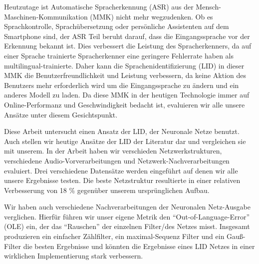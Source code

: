 
\Abstract

Heutzutage ist Automatische Spracherkennung (ASR) aus der Mensch-Maschinen-Kommunikation (MMK) nicht mehr wegzudenken. Ob es Sprachkontrolle, Sprachübersetzung oder persönliche Assistenten auf dem Smartphone sind, der ASR Teil beruht darauf,  dass die Eingangssprache vor der Erkennung bekannt ist. Dies verbessert die Leistung des Spracherkenners, da auf einer Sprache trainierte Spracherkenner eine geringere Fehlerrate haben als multilingual-trainierte. Daher kann die Sprachenidentifizierung (LID) in dieser MMK die Benutzerfreundlichkeit und Leistung verbessern, da keine Aktion des Benutzers mehr erforderlich wird um die Eingangssprache zu ändern und ein anderes Modell zu laden. Da diese MMK in der heutigen Technologie immer auf Online-Performanz und Geschwindigkeit bedacht ist, evaluieren wir alle unsere Ansätze unter diesem Gesichtspunkt.

Diese Arbeit untersucht einen Ansatz der LID, der Neuronale Netze benutzt. Auch stellen wir heutige Ansätze der LID der Literatur  dar und vergleichen sie mit unserem. In der Arbeit haben wir verschieden Netzwerkstrukturen, verschiedene Audio-Vorverarbeitungen und Netzwerk-Nachverarbeitungen evaluiert. Drei verschiedene Datensätze werden eingeführt auf denen wir alle unsere Ergebnisse testen. Die beste Netzstruktur resultierte in einer relativen Verbesserung von 18 \% gegenüber unserem ursprünglichen Aufbau.

Wir haben auch verschiedene Nachverarbeitungen der Neuronalen Netz-Ausgabe verglichen. Hierfür führen wir unser eigene Metrik den ``Out-of-Language-Error'' (OLE) ein, der das ``Rauschen'' der einzelnen Filter/des Netzes misst. Insgesamt produzieren ein einfacher Zählfilter, ein maximal-Sequenz Filter und ein Gauß-Filter die besten Ergebnisse und könnten die Ergebnisse eines LID Netzes in einer wirklichen Implementierung stark verbessern.